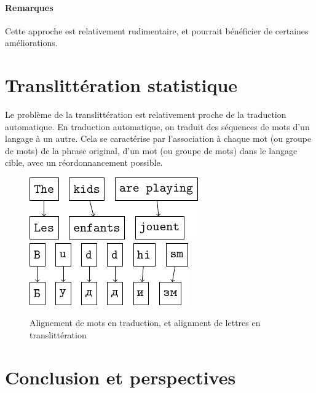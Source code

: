 \documentclass{article}
\begin{document}
\paragraph{Remarques}
Cette approche est relativement rudimentaire, et pourrait bénéficier de certaines améliorations.

\section{Translittération statistique}
Le problème de la translittération est relativement proche de la traduction automatique. En traduction automatique, on traduit des séquences de mots d'un langage à un autre. Cela se caractérise par l'association à chaque mot (ou groupe de mots) de la phrase original, d'un mot (ou groupe de mots) dans le langage cible, avec un réordonnancement possible.

\begin{figure}[H]
\caption{Alignement de mots en traduction, et alignment de lettres en translittération}
\centering
\vspace{0.3cm}
\includegraphics{word_alignment.pdf}
\hspace{0.5cm}
\includegraphics{letter_alignment.pdf}
\end{figure}

\section{Conclusion et perspectives}
\nocite{*}


\end{document}
